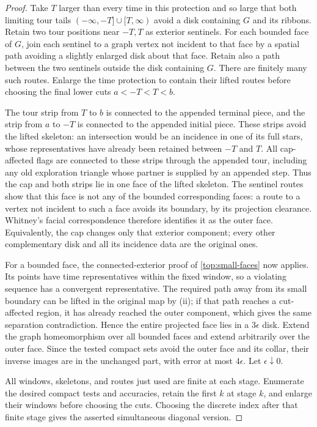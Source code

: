\documentclass[11pt]{article}
\numberwithin{equation}{section}
\theoremstyle{definition}
\theoremstyle{remark}
\newcommand{\1}{\mathbf 1}
\begin{document}
\begin{proof}
Take $T$ larger than every time in this protection and so large that
both limiting tour tails $(-\infty,-T]\cup[T,\infty)$ avoid a disk
containing $G$ and its ribbons.  Retain two tour positions near
$-T,T$ as exterior sentinels.  For each bounded face of $G$, join each
sentinel to a graph vertex not incident to that face by a spatial
path avoiding a slightly enlarged disk about that face.  Retain also
a path between the two sentinels outside the disk containing $G$.
There are finitely many such routes.  Enlarge the time protection
to contain their lifted routes before choosing the final lower
cuts $a<-T<T<b$.

The tour strip from $T$ to $b$ is connected to the appended terminal
piece, and the strip from $a$ to $-T$ is connected to the appended
initial piece.  These strips avoid the lifted skeleton: an
intersection would be an incidence in one of its full stars, whose
representatives have already been retained between $-T$ and $T$.
All cap-affected flags are connected to these strips through the
appended tour, including any old exploration triangle whose partner
is supplied by an appended step.  Thus the cap and both strips lie
in one face of the lifted skeleton.  The sentinel routes show that
this face is not any of the bounded corresponding faces: a route
to a vertex not incident to such a face avoids its boundary, by its
projection clearance.  Whitney's facial correspondence therefore
identifies it as the outer face.  Equivalently, the cap changes
only that exterior component; every other complementary disk and
all its incidence data are the original ones.

For a bounded face, the connected-exterior proof of
\eqref{top:small-faces} now applies.  Its points have time
representatives within the fixed window, so a violating sequence
has a convergent representative.  The required path away from its
small boundary can be lifted in the original map by (ii); if that
path reaches a cut-affected region, it has already reached the outer
component, which gives the same separation contradiction.  Hence
the entire projected face lies in a $3\epsilon$ disk.  Extend the
graph homeomorphism over all bounded faces and extend arbitrarily
over the outer face.  Since the tested compact sets avoid the
outer face and its collar, their inverse images are in the unchanged
part, with error at most $4\epsilon$.  Let $\epsilon\downarrow0$.

All windows, skeletons, and routes just used are finite at each
stage.  Enumerate the desired compact tests and accuracies, retain
the first $k$ at stage $k$, and enlarge their windows before choosing
the cuts.  Choosing the discrete index after that finite stage
gives the asserted simultaneous diagonal version.
\end{proof}
\end{document}
